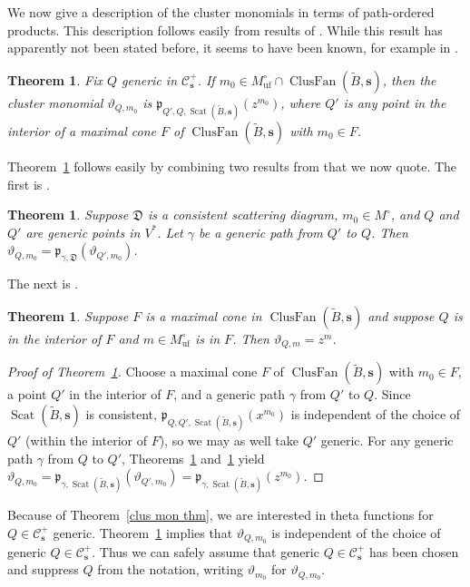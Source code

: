 \documentclass{amsart}
\newtheorem{theorem}[proposition]{Theorem}
\theoremstyle{definition}
\theoremstyle{remark}
\numberwithin{equation}{section}
\newcommand{\thet}{\vartheta}
\newcommand{\uf}{{\operatorname{uf}}}
\newcommand{\D}{{\mathfrak D}}
\newcommand{\p}{{\mathfrak p}}
\newcommand{\0}{{\mathbf{0}}}
\newcommand{\s}{\mathbf{s}}
\newcommand{\tB}{\tilde{B}}
\newcommand{\C}{\mathcal{C}}
\newcommand{\Scat}{\operatorname{Scat}}
\newcommand{\ClusFan}{\operatorname{ClusFan}}
\begin{document}
We now give a description of the cluster monomials in terms of path-ordered products.
This description follows easily from results of \cite{GHKK}.
While this result has apparently not been stated before, it seems to have been known, for example in \cite{CGMMRSW}.


\begin{theorem}\label{clus mon pop}
Fix $Q$ generic in $\C_\s^+$.
If $m_0\in M_\uf^\circ\cap\ClusFan(\tB,\s)$, then the cluster monomial $\thet_{Q,m_0}$ is $\p_{Q',Q,\Scat(\tB,\s)}(z^{m_0})$, where $Q'$ is any point in the interior of a maximal cone $F$ of $\ClusFan(\tB,\s)$ with $m_0\in F$.
\end{theorem}

Theorem~\ref{clus mon pop} follows easily by combining two results from \cite[Section~3]{GHKK} that we now quote.
The first is \cite[Theorem~3.5]{GHKK}.

\begin{theorem}\label{change of basepoint}
Suppose $\D$ is a consistent scattering diagram, $m_0\in M^\circ$, and $Q$ and $Q'$ are generic points in $V^*$.
Let $\gamma$ be a generic path from $Q'$ to $Q$.
Then $\thet_{Q,m_0}=\p_{\gamma,\D}(\thet_{Q',m_0})$.
\end{theorem}

The next is \cite[Corollary~3.9]{GHKK}.

\begin{theorem}\label{easy theta}
Suppose $F$ is a maximal cone in $\ClusFan(\tB,\s)$ and suppose $Q$ is in the interior of $F$ and $m\in M^\circ_\uf$ is in $F$.
Then $\thet_{Q,m}=z^m$.
\end{theorem}

\begin{proof}[Proof of Theorem~\ref{clus mon pop}]
Choose a maximal cone $F$ of $\ClusFan(\tB,\s)$ with $m_0\in F$, a point $Q'$ in the interior of $F$, and a generic path $\gamma$ from $Q'$ to $Q$.
Since $\Scat(\tB,\s)$ is consistent, $\p_{Q,Q',\Scat(\tB,\s)}(x^{m_0})$ is independent of the choice of $Q'$ (within the interior of $F$), so we may as well take $Q'$ generic.
For  any generic path $\gamma$ from $Q$ to $Q'$, Theorems~\ref{change of basepoint} and~\ref{easy theta} yield $\thet_{Q,m_0}=\p_{\gamma,\Scat(\tB,\s)}(\thet_{Q',m_0})=\p_{\gamma,\Scat(\tB,\s)}(z^{m_0})$.
\end{proof}

Because of Theorem~\ref{clus mon thm}, we are interested in theta functions for $Q\in\C_\s^+$ generic.
Theorem~\ref{change of basepoint} implies that $\thet_{Q,m_0}$ is independent of the choice of generic $Q\in\C_\s^+$.
Thus we can safely assume that generic $Q\in\C_\s^+$ has been chosen and suppress $Q$ from the notation, writing $\thet_{m_0}$ for $\thet_{Q,m_0}$.
\end{document}
